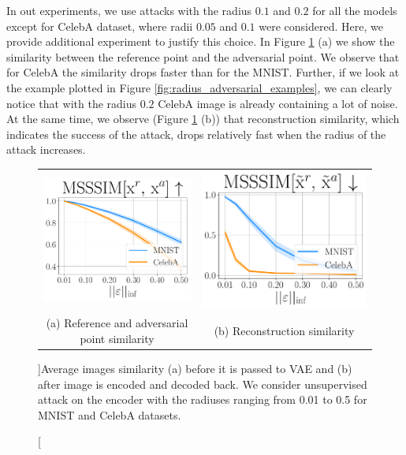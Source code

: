 In out experiments, we use attacks with the radius $0.1$ and $0.2$ for all the models except for CelebA dataset, where radii $0.05$ and $0.1$ were considered. Here, we provide additional experiment to justify this choice. In Figure \ref{fig:radius_metrics} (a) we show the similarity between the reference point and the adversarial point. We observe that for CelebA the similarity drops faster than for the MNIST. Further, if we look at the example plotted in Figure \ref{fig:radius_adversarial_examples}, we can clearly notice that with the radius $0.2$ CelebA image is already containing a lot of noise. At the same time, we observe (Figure \ref{fig:radius_metrics} (b)) that reconstruction similarity, which indicates the success of the attack, drops relatively fast when the radius of the attack increases. 

\begin{figure}[ht]
    \centering
    \begin{tabular}{cc}
        \includegraphics[width=0.4\columnwidth]{pics/3_adv_att/radius_ref_sim.pdf} &
        \includegraphics[width=0.4\columnwidth]{pics/3_adv_att/radius_ref_rec_sim.pdf} \\
        \multirow{2}{0.4\columnwidth}{\centering \small (a) Reference and adversarial point similarity} &
        \multirow{2}{0.4\columnwidth}{\centering \small (b) Reconstruction similarity } 
        \\
        \\
    \end{tabular}
    \caption[][\baselineskip]{Average images similarity (a) before it is passed to VAE and (b) after image is encoded and decoded back. We consider unsupervised attack on the encoder with the radiuses ranging from 0.01 to 0.5 for MNIST and CelebA datasets.}
    \label{fig:radius_metrics}
        \vspace*{2\baselineskip}
\end{figure}

